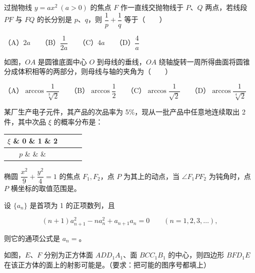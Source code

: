 \begin{question}
过抛物线 $y=ax^2\ (a>0)$ 的焦点 $F$ 作一直线交抛物线于 $P$、$Q$ 两点，若线段 $PF$ 与 $FQ$ 的长分别是 $p$、$q$，则 $\dfrac1p+\dfrac1q$ 等于\mbox{（　　）}

（A）$2a$　　（B）$\dfrac1{2a}$　　（C）$4a$　　（D）$\dfrac4a$

\Needspace{0.4\textheight}
\end{question}
\begin{question}
如图，$OA$ 是圆锥底面中心 $O$ 到母线的垂线，$OA$ 绕轴旋转一周所得曲面将圆锥分成体积相等的两部分，则母线与轴的夹角为\mbox{（　　）}
\nopagebreak[4]
\begin{center}\end{center}
\nopagebreak[4]
（A）$\arccos\dfrac1{\sqrt[3]{2}}$　　（B）$\arccos\dfrac12$　　（C）$\arccos\dfrac1{\sqrt2}$　　（D）$\arccos\dfrac1{\sqrt[4]{2}}$

\end{question}

\begin{question}
某厂生产电子元件，其产品的次品率为 5\%，现从一批产品中任意地连续取出 2 件，其中次品 $\xi$ 的概率分布是：

\begin{center}
\begin{tabular}{c|ccc}
$\xi$ \& 0 \& 1 \& 2 \\
\hline
$p$ \& \& \& \\
\end{tabular}
\end{center}

\end{question}
\begin{question}
椭圆 $\dfrac{x^2}{9}+\dfrac{y^2}{4}=1$ 的焦点 $F_1,F_2$，点 $P$ 为其上的动点，当 $\angle F_1PF_2$ 为钝角时，点 $P$ 横坐标的取值范围是\gkblank{}。

\end{question}
\begin{question}
设 $\{a_n\}$ 是首项为 1 的正项数列，且

\nopagebreak[4]
\[
(n+1)a_{n+1}^2-na_n^2+a_{n+1}a_n=0
\qquad(n=1,2,3,\ldots),
\]

则它的通项公式是 $a_n=$\gkblank{}。

\Needspace{0.4\textheight}
\end{question}
\begin{question}
如图，$E$、$F$ 分别为正方体面 $ADD_1A_1$、面 $BCC_1B_1$ 的中心，则四边形 $BFD_1E$ 在该正方体的面上的射影可能是\gkblank{}。（要求：把可能的图序号都填上）
\nopagebreak[4]
\begin{center}\end{center}
\nopagebreak[4]
\end{question}

